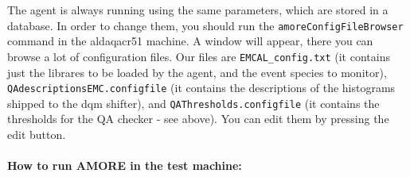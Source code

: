 The agent is always running using the same parameters, which are
stored in a database. In order to change them, you should run the
\texttt{amoreConfigFileBrowser} command in the aldaqacr51 machine. A
window will appear, there you can browse a lot of configuration
files. Our files are \texttt{EMCAL\_config.txt} (it contains just the
librares to be loaded by the agent, and the event species to monitor),
\texttt{QAdescriptions\-EMC.configfile} (it contains the descriptions
of the histograms shipped to the dqm shifter), and
\texttt{QAThresholds.configfile} (it contains the thresholds for the
QA checker - see above). You can edit them by pressing the edit button.

\paragraph{How to run AMORE in the test machine:}

